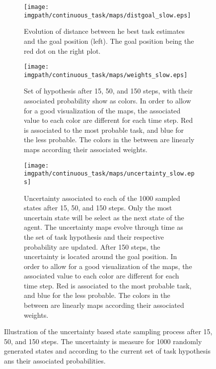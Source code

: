 \begin{figure}[!htbp]
\centering
    \begin{subfigure}[b]{\columnwidth}
        \centering
        \texttt{[image: \\imgpath/continuous\_task/maps/distgoal\_slow.eps]}
        \caption{Evolution of distance between he best task estimates and the goal position (left). The goal position being the red dot on the right plot.}
        \label{fig:continuoustaskexampleslowdist}
    \end{subfigure}
    \begin{subfigure}[b]{\columnwidth}
        \centering
        \texttt{[image: \\imgpath/continuous\_task/maps/weights\_slow.eps]}
        \caption{Set of hypothesis after 15, 50, and 150 steps, with their associated probability show as colors. In order to allow for a good visualization of the maps, the associated value to each color are different for each time step. Red is associated to the most probable task, and blue for the less probable. The colors in the between are linearly maps according their associated weights.}
        \label{fig:continuoustaskexampleslowweights}
    \end{subfigure}
    \begin{subfigure}[b]{\columnwidth}
        \centering
        \texttt{[image: \\imgpath/continuous\_task/maps/uncertainty\_slow.eps]}
        \caption{Uncertainty associated to each of the 1000 sampled states after 15, 50, and 150 steps. Only the most uncertain state will be select as the next state of the agent. The uncertainty maps evolve through time as the set of task hypothesis and their respective probability are updated. After 150 steps, the uncertainty is located around the goal position. In order to allow for a good visualization of the maps, the associated value to each color are different for each time step. Red is associated to the most probable task, and blue for the less probable. The colors in the between are linearly maps according their associated weights.}
        \label{fig:continuoustaskexampleslowuncertainty}
    \end{subfigure}
\caption{Illustration of the uncertainty based state sampling process after 15, 50, and 150 steps. The uncertainty is measure for 1000 randomly generated states and according to the current set of task hypothesis ans their associated probabilities.}
\label{fig:continuoustasktasksamplingexampleslow}
\end{figure}